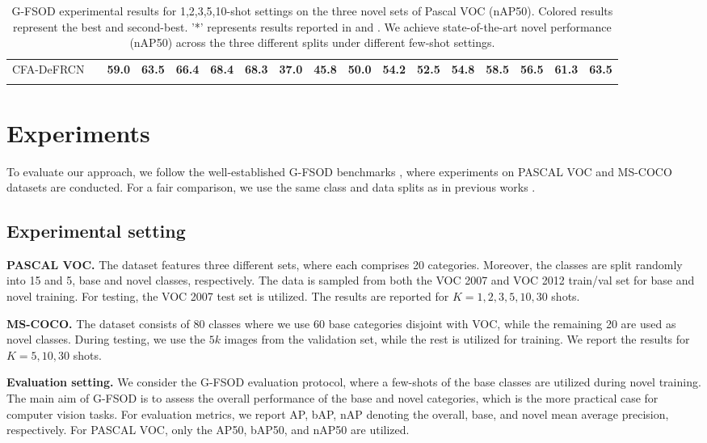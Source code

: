 \documentclass[10pt,twocolumn,letterpaper]{article}
\newcommand{\cmark}{\ding{51}}\newcommand{\xmark}{\ding{55}}\newcommand\minisection[1]{\vspace{1mm}\noindent \textbf{#1}}
\newcommand{\best}[1]{\color{red}\textbf{#1}}
\begin{document}
\begin{table*}
\begin{tabular}{c| c | c c c c c | c c c c c | c c c c c}
      \rowcolor[HTML]{EFEFEF}
      CFA-DeFRCN& \cmark & \best{59.0} & \best{63.5} & \best{66.4} & \best{68.4} & \best{68.3} & \best{37.0} & \best{45.8} & \best{50.0} & \best{54.2} & \best{52.5} & \best{54.8} & \best{58.5} & \best{56.5} & \best{61.3} & \best{63.5} \\
      \Xhline{1pt}
    \end{tabular}
    \caption{G-FSOD experimental results for 1,2,3,5,10-shot settings on the three novel sets of Pascal VOC (nAP50). Colored results represent the {\color{red}best} and {\color{blue}second-best}. '*' represents results reported in \cite{gfsod} and \cite{defrcn}. We achieve state-of-the-art novel performance (nAP50) across the three different splits under different few-shot settings.}
    \vspace{-2em}
    \label{tab:voc-novel}
\end{table*} 
\section{Experiments}
To evaluate our approach, we follow the well-established G-FSOD benchmarks \cite{TFA, gfsod, defrcn}, where experiments on PASCAL VOC \cite{pascalvoc} and MS-COCO \cite{coco} datasets are conducted. For a fair comparison, we use the same class and data splits as in previous works \cite{FSRW, TFA, MPSR}. 

\subsection{Experimental setting}

\textbf{PASCAL VOC.} The dataset features three different sets, where each comprises 20 categories. Moreover, the classes are split randomly into 15 and 5, base and novel classes, respectively. The data is sampled from both the VOC 2007 and VOC 2012 train/val set for base and novel training. For testing, the VOC 2007 test set is utilized. The results are reported for $K= 1,2,3,5,10,30$ shots.

\textbf{MS-COCO.} The dataset consists of 80 classes where we use 60 base categories disjoint with VOC, while the remaining 20 are used as novel classes. During testing, we use the $5k$ images from the validation set, while the rest is utilized for training. We report the results for $K=5, 10, 30$ shots. 

\textbf{Evaluation setting.}  We consider the G-FSOD evaluation protocol, where a few-shots of the base classes are utilized during novel training. The main aim of G-FSOD is to assess the overall performance of the base and novel categories, which is the more practical case for computer vision tasks. For evaluation metrics, we report AP, bAP, nAP denoting the overall, base, and novel mean average precision, respectively. For PASCAL VOC, only the AP50, bAP50, and nAP50 are utilized.
\end{document}

